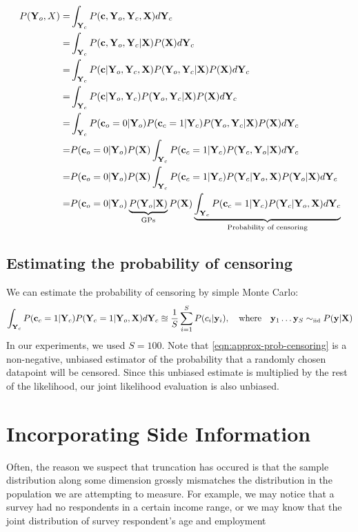 \documentclass{article}
\begin{document}
\begin{align}
P(\mathbf{Y}_o , X) = & \int_{\mathbf{Y}_c} P( {\bf{c}}, \mathbf{Y}_o, \mathbf{Y}_c, \mathbf{X} ) d\mathbf{Y}_c \\
= & \int_{\mathbf{Y}_c} P( {\bf{c}}, \mathbf{Y}_o, \mathbf{Y}_c | \mathbf{X} ) P( \mathbf{X} ) d\mathbf{Y}_c \\
= & \int_{\mathbf{Y}_c} P( {\bf{c}} | \mathbf{Y}_o, \mathbf{Y}_c, \mathbf{X} ) P( \mathbf{Y}_o, \mathbf{Y}_c | \mathbf{X} ) P( \mathbf{X} ) d\mathbf{Y}_c \\
= & \int_{\mathbf{Y}_c} P( {\bf{c}} | \mathbf{Y}_o, \mathbf{Y}_c) P( \mathbf{Y}_o, \mathbf{Y}_c | \mathbf{X} ) P( \mathbf{X} ) d\mathbf{Y}_c \\
= & \int_{\mathbf{Y}_c} P( {\bf{c}}_o = 0 | \mathbf{Y}_o ) P( {\bf{c}}_c = 1 | \mathbf{Y}_c ) P( \mathbf{Y}_o, \mathbf{Y}_c | \mathbf{X} ) P( \mathbf{X} ) d\mathbf{Y}_c \\
= & P( {\bf{c}}_o = 0 | \mathbf{Y}_o ) P( \mathbf{X} ) \int_{\mathbf{Y}_c} P( {\bf{c}}_c = 1 | \mathbf{Y}_c ) P( \mathbf{Y}_c, \mathbf{Y}_o | \mathbf{X} ) d\mathbf{Y}_c  \\
= & P( {\bf{c}}_o = 0 | \mathbf{Y}_o ) P( \mathbf{X} ) \int_{\mathbf{Y}_c} P( {\bf{c}}_c = 1 | \mathbf{Y}_c ) P( \mathbf{Y}_c | \mathbf{Y}_o, \mathbf{X} ) P( \mathbf{Y}_o | \mathbf{X} ) d\mathbf{Y}_c  \\
= & P( {\bf{c}}_o = 0 | \mathbf{Y}_o ) \underbrace{P( \mathbf{Y}_o | \mathbf{X} )}_{\textrm{GPs}} P( \mathbf{X} ) \underbrace{\int_{\mathbf{Y}_c} P( {\bf{c}}_c = 1 | \mathbf{Y}_c ) P( \mathbf{Y}_c | \mathbf{Y}_o, \mathbf{X} ) d\mathbf{Y}_c }_{\textrm{Probability of censoring}}
\label{eqn:full_censoring_likelihood}
\end{align}

\subsection{Estimating the probability of censoring}

We can estimate the probability of censoring by simple Monte Carlo:
%
\begin{align}
\int_{\vY_c} P( \vc_c = 1 | \vY_c ) P( \vY_c = 1 | \vY_o, \vX ) d\vY_c \approxeq \frac{1}{S} \sum_{i=1}^S P(c_i | \vy_i ), \quad \textrm{where} \quad \vy_1 \dots \vy_S \simiid P(\vy | \vX )
\label{eqn:approx-prob-censoring}
\end{align}
%
In our experiments, we used $S = 100$.  Note that \eqref{eqn:approx-prob-censoring} is a non-negative, unbiased estimator of the probability that a randomly chosen datapoint will be censored.  Since this unbiased estimate is multiplied by the rest of the likelihood, our joint likelihood evaluation is also unbiased.

\section{Incorporating Side Information}

Often, the reason we suspect that truncation has occured is that the sample distribution along some dimension grossly mismatches the distribution in the population we are attempting to measure.  For example, we may notice that a survey had no respondents in a certain income range, or we may know that the joint distribution of survey respondent's age and employment
\end{document}
